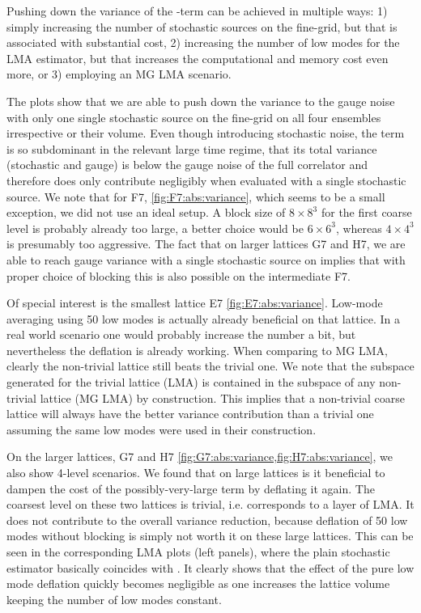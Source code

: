 Pushing down the variance of the -term can be achieved in multiple ways:
1) simply increasing the number of stochastic sources on the fine-grid, but that is associated with substantial cost,
2) increasing the number of low modes for the LMA estimator, but that increases the computational and memory cost even more,
or 3) employing an MG LMA scenario.

The plots show that we are able to push down the  variance to the gauge noise with only one single stochastic source on the fine-grid on all four ensembles irrespective or their volume.
Even though introducing stochastic noise, the  term is so subdominant in the relevant large time regime, that its total variance (stochastic and gauge) is below the gauge noise of the full correlator and therefore does only contribute negligibly when evaluated with a single stochastic source.
We note that for F7, \cref{fig:F7:abs:variance}, which seems to be a small exception, we did not use an ideal setup.
A block size of $8 \times 8^{3}$ for the first coarse level  is probably already too large, a better choice would be $6 \times 6^{3}$, whereas $4 \times 4^{3}$ is presumably too aggressive.
The fact that on larger lattices G7 and H7, we are able to reach gauge variance with a single stochastic source on  implies that with proper choice of blocking this is also possible on the intermediate F7.

Of special interest is the smallest lattice E7 \cref{fig:E7:abs:variance}.
Low-mode averaging using \num{50} low modes is actually already beneficial on that lattice.
In a real world scenario one would probably increase the number a bit, but nevertheless the deflation is already working.
When comparing to MG LMA, clearly the non-trivial lattice still beats the trivial one.
We note that the subspace generated for the trivial lattice (LMA) is contained in the subspace of any non-trivial lattice (MG LMA) by construction.
This implies that a non-trivial coarse lattice will always have the better variance contribution than a trivial one assuming the same low modes were used in their construction.

On the larger lattices, G7 and H7 \cref{fig:G7:abs:variance,fig:H7:abs:variance}, we also show 4-level scenarios.
We found that on large lattices is it beneficial to dampen the cost of the possibly-very-large  term by deflating it again.
The coarsest level on these two lattices is trivial, i.e. corresponds to a layer of LMA.
It does not contribute to the overall variance reduction, because deflation of \num{50} low modes without blocking is simply not worth it on these large lattices.
This can be seen in the corresponding LMA plots (left panels), where the plain stochastic estimator basically coincides with .
It clearly shows that the effect of the pure low mode deflation quickly becomes negligible as one increases the lattice volume keeping the number of low modes constant.


